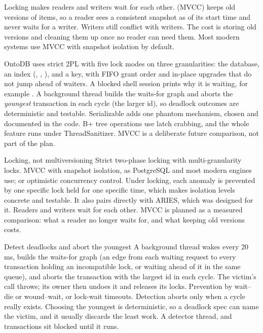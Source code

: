 Locking makes readers and writers wait for each other.  (MVCC) keeps old versions of items, so a reader sees a
consistent snapshot as of its start time and never waits for a writer. Writers
still conflict with writers. The cost is storing old versions and cleaning them
up once no reader can need them. Most modern systems use MVCC with snapshot
isolation by default.

\begin{ontodb}
OntoDB uses strict 2PL with five lock modes on three granularities: the
database, an index (, , ), and a key, with
FIFO grant order and in-place upgrades that do not jump ahead of waiters. A
blocked shell session prints why it is waiting, for example
. A background thread builds the
waits-for graph and aborts the \emph{youngest} transaction in each cycle (the
larger id), so deadlock outcomes are deterministic and testable. Serializable
adds one phantom mechanism, chosen and documented in the code. B+ tree
operations use latch crabbing, and the whole feature runs under
ThreadSanitizer. MVCC is a deliberate future comparison, not part of the plan.
\end{ontodb}

\begin{decision}{Locking, not multiversioning}
 Strict two-phase locking with multi-granularity locks.
 MVCC with snapshot isolation, as PostgreSQL and most
modern engines use; or optimistic concurrency control.
 Under locking, each anomaly is prevented by one specific lock held
for one specific time, which makes isolation levels concrete and testable. It
also pairs directly with ARIES, which was designed for it.
 Readers and writers wait for each other. MVCC is planned as a
measured comparison: what a reader no longer waits for, and what keeping old
versions costs.
\end{decision}

\begin{decision}{Detect deadlocks and abort the youngest}
 A background thread wakes every 20 ms, builds the waits-for
graph (an edge from each waiting request to every transaction holding an
incompatible lock, or waiting ahead of it in the same queue), and aborts the
transaction with the largest id in each cycle. The victim's  call
throws; its owner then undoes it and releases its locks.
 Prevention by wait--die or wound--wait, or lock-wait
timeouts.
 Detection aborts only when a cycle really exists. Choosing the
youngest is deterministic, so a deadlock spec can name the victim, and it
usually discards the least work.
 A detector thread, and transactions sit blocked until it runs.
\end{decision}

